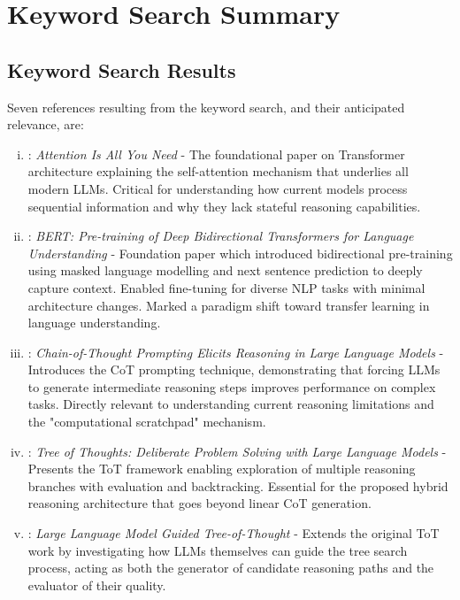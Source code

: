 \documentclass[a4paper,oneside,12pt]{book}
\numberwithin{equation}{chapter} %
\begin{document}
\section{Keyword Search Summary}
\subsection{Keyword Search Results}

Seven references resulting from the keyword search, and their anticipated relevance, are:
\begin{enumerate} [(i)]
\item \cite{vaswani2023attentionneed}: \textit{Attention Is All You Need} - The foundational paper on Transformer architecture explaining the self-attention mechanism that underlies all modern LLMs. Critical for understanding how current models process sequential information and why they lack stateful reasoning capabilities.

\item \cite{devlin2019bertpretrainingdeepbidirectional}: \textit{
BERT: Pre-training of Deep Bidirectional Transformers for Language Understanding} - Foundation paper which introduced bidirectional pre-training using masked language modelling and next sentence prediction to deeply capture context. Enabled fine-tuning for diverse NLP tasks with minimal architecture changes. Marked a paradigm shift toward transfer learning in language understanding.

\item \cite{wei2023chainofthoughtpromptingelicitsreasoning}: \textit{Chain-of-Thought Prompting Elicits Reasoning in Large Language Models} - Introduces the CoT prompting technique, demonstrating that forcing LLMs to generate intermediate reasoning steps improves performance on complex tasks. Directly relevant to understanding current reasoning limitations and the "computational scratchpad" mechanism. 

\item \cite{yao2023treethoughtsdeliberateproblem}: \textit{Tree of Thoughts: Deliberate Problem Solving with Large Language Models} - Presents the ToT framework enabling exploration of multiple reasoning branches with evaluation and backtracking. Essential for the proposed hybrid reasoning architecture that goes beyond linear CoT generation. 

\item \cite{long2023largelanguagemodelguided}: \textit{Large Language Model Guided Tree-of-Thought} - Extends the original ToT work by investigating how LLMs themselves can guide the tree search process, acting as both the generator of candidate reasoning paths and the evaluator of their quality. 


\end{enumerate}
\end{document}
